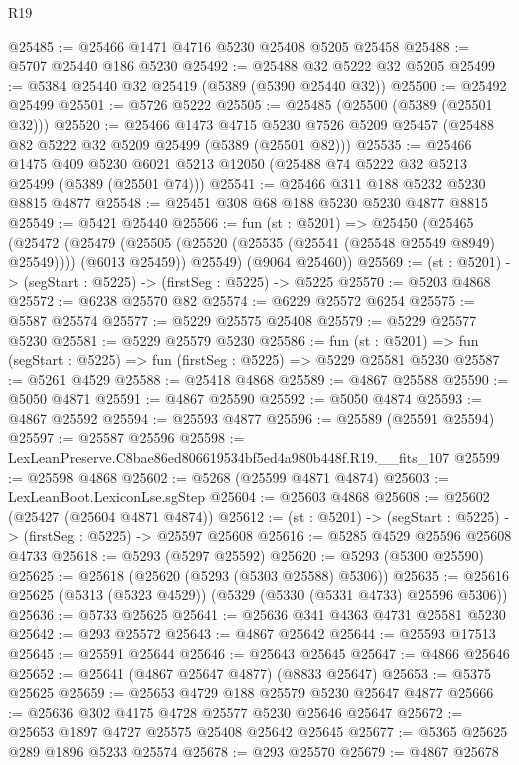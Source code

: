\begin{lexlean}{R19}
\begin{coremodule}
@25485 := @25466 @1471 @4716 @5230 @25408 @5205 @25458
@25488 := @5707 @25440 @186 @5230
@25492 := @25488 @32 @5222 @32 @5205
@25499 := @5384 @25440 @32 @25419 (@5389 (@5390 @25440 @32))
@25500 := @25492 @25499
@25501 := @5726 @5222
@25505 := @25485 (@25500 (@5389 (@25501 @32)))
@25520 := @25466
    @1473
    @4715
    @5230
    @7526
    @5209
    @25457
    (@25488 @82 @5222 @32 @5209 @25499 (@5389 (@25501 @82)))
@25535 := @25466
    @1475
    @409
    @5230
    @6021
    @5213
    @12050
    (@25488 @74 @5222 @32 @5213 @25499 (@5389 (@25501 @74)))
@25541 := @25466 @311 @188 @5232 @5230 @8815 @4877
@25548 := @25451 @308 @68 @188 @5230 @5230 @4877 @8815
@25549 := @5421 @25440
@25566 := fun (st : @5201) =>
  @25450
    (@25465
      (@25472
        (@25479 (@25505 (@25520 (@25535 (@25541 (@25548 @25549 @8949) @25549)))) (@6013 @25459))
        @25549)
      (@9064 @25460))
@25569 := (st : @5201) -> (segStart : @5225) -> (firstSeg : @5225) -> @5225
@25570 := @5203 @4868
@25572 := @6238 @25570 @82
@25574 := @6229 @25572 @6254
@25575 := @5587 @25574
@25577 := @5229 @25575 @25408
@25579 := @5229 @25577 @5230
@25581 := @5229 @25579 @5230
@25586 := fun (st : @5201) => fun (segStart : @5225) => fun (firstSeg : @5225) => @5229 @25581 @5230
@25587 := @5261 @4529
@25588 := @25418 @4868
@25589 := @4867 @25588
@25590 := @5050 @4871
@25591 := @4867 @25590
@25592 := @5050 @4874
@25593 := @4867 @25592
@25594 := @25593 @4877
@25596 := @25589 (@25591 @25594)
@25597 := @25587 @25596
@25598 := LexLeanPreserve.C8bae86ed806619534bf5ed4a980b448f.R19.__fits_107
@25599 := @25598 @4868
@25602 := @5268 (@25599 @4871 @4874)
@25603 := LexLeanBoot.LexiconLse.sgStep
@25604 := @25603 @4868
@25608 := @25602 (@25427 (@25604 @4871 @4874))
@25612 := (st : @5201) -> (segStart : @5225) -> (firstSeg : @5225) -> @25597 @25608
@25616 := @5285 @4529 @25596 @25608 @4733
@25618 := @5293 (@5297 @25592)
@25620 := @5293 (@5300 @25590)
@25625 := @25618 (@25620 (@5293 (@5303 @25588) @5306))
@25635 := @25616 @25625 (@5313 (@5323 @4529)) (@5329 (@5330 (@5331 @4733) @25596 @5306))
@25636 := @5733 @25625
@25641 := @25636 @341 @4363 @4731 @25581 @5230
@25642 := @293 @25572
@25643 := @4867 @25642
@25644 := @25593 @17513
@25645 := @25591 @25644
@25646 := @25643 @25645
@25647 := @4866 @25646
@25652 := @25641 (@4867 @25647 @4877) (@8833 @25647)
@25653 := @5375 @25625
@25659 := @25653 @4729 @188 @25579 @5230 @25647 @4877
@25666 := @25636 @302 @4175 @4728 @25577 @5230 @25646 @25647
@25672 := @25653 @1897 @4727 @25575 @25408 @25642 @25645
@25677 := @5365 @25625 @289 @1896 @5233 @25574
@25678 := @293 @25570
@25679 := @4867 @25678

\end{coremodule}
\end{lexlean}
